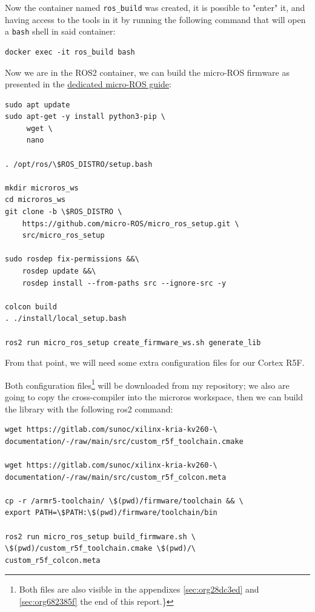 \documentclass[10pt]{article}
\begin{document}
Now the container named \texttt{ros\_build} was created, it is possible to "enter" it, and having access
to the tools in it by running the following command that will open a \texttt{bash} shell in said container:
\begin{verbatim}
docker exec -it ros_build bash
\end{verbatim}

Now we are in the ROS2 container, we can build the micro-ROS firmware as presented
in the \href{https://micro.ros.org/docs/tutorials/advanced/create\\\_custom\\\_static\\\_library}{dedicated micro-ROS guide}:
\begin{verbatim}
sudo apt update 
sudo apt-get -y install python3-pip \
     wget \
     nano

. /opt/ros/\$ROS_DISTRO/setup.bash

mkdir microros_ws
cd microros_ws
git clone -b \$ROS_DISTRO \
    https://github.com/micro-ROS/micro_ros_setup.git \
    src/micro_ros_setup

sudo rosdep fix-permissions &&\
    rosdep update &&\
    rosdep install --from-paths src --ignore-src -y

colcon build
. ./install/local_setup.bash

ros2 run micro_ros_setup create_firmware_ws.sh generate_lib
\end{verbatim}

From that point, we will need some extra configuration files for our Cortex R5F.

Both configuration files\footnote{Both files are also visible in the appendixes \ref{sec:org28dc3ed}
and \ref{sec:org682385f} the end of this report.\}} will be downloaded from my repository;
we also are going to copy the cross-compiler into the microros workspace,
then we can build the library with the following ros2 command:
\begin{verbatim}
wget https://gitlab.com/sunoc/xilinx-kria-kv260-\
documentation/-/raw/main/src/custom_r5f_toolchain.cmake

wget https://gitlab.com/sunoc/xilinx-kria-kv260-\
documentation/-/raw/main/src/custom_r5f_colcon.meta

cp -r /armr5-toolchain/ \$(pwd)/firmware/toolchain && \
export PATH=\$PATH:\$(pwd)/firmware/toolchain/bin

ros2 run micro_ros_setup build_firmware.sh \
\$(pwd)/custom_r5f_toolchain.cmake \$(pwd)/\
custom_r5f_colcon.meta
\end{verbatim}
\pagebreak
\end{document}
